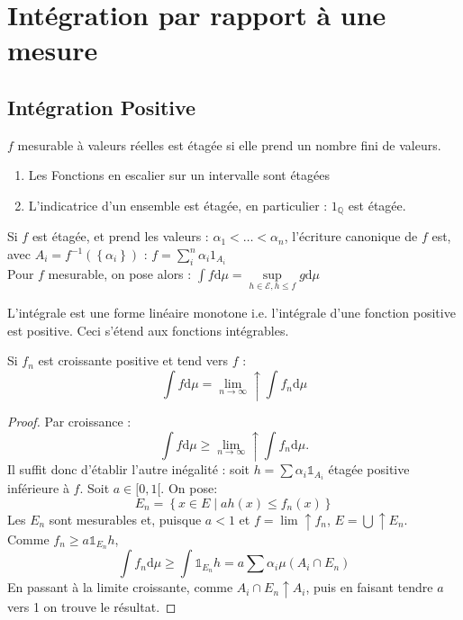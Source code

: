 \documentclass{cours}
\begin{document}
\section{Intégration par rapport à une mesure}
\subsection{Intégration Positive}
\begin{definition}
    $f$ mesurable à valeurs réelles est étagée si elle prend un nombre fini de valeurs.
\end{definition}
\begin{remark}
    \begin{enumerate}
        \item Les Fonctions en escalier sur un intervalle sont étagées
        \item L'indicatrice d'un ensemble est étagée, en particulier : $1_{\mathbb{Q}}$ est étagée.
    \end{enumerate}
\end{remark}
\begin{definition}
    Si $f$ est étagée, et prend les valeurs : $\alpha_{1} < \ldots < \alpha_{n}$, l'écriture canonique de $f$ est, avec $A_{i} = f^{-1}(\left\{\alpha_{i}\right\})$ :
    $f =  \sum\limits_{i}^{n} \alpha_{i}1_{A_{i}}$\\
    Pour $f$ mesurable, on pose alors : $\int f \mathrm{d}\mu = \sup\limits_{h \in \mathcal{E}, h \leq f} g \mathrm{d}\mu$
\end{definition}
\begin{proposition}
    L'intégrale est une forme linéaire monotone i.e. l'intégrale d'une fonction positive est positive. Ceci s'étend aux fonctions intégrables.
\end{proposition}
\begin{theorem}\label{TCM}
    Si $f_{n}$ est croissante positive et tend vers $f$ :
    \[
        \int f \mathrm{d}\mu = \lim_{n\to \infty} \uparrow \int f_{n} \mathrm{d} \mu
    \]
\end{theorem}
\begin{proof}
    Par croissance : \[ \int f \mathrm{d}\mu \geq \lim_{n \to \infty}\uparrow \int f_{n} \mathrm{d}\mu.\]
    Il suffit donc d'établir l'autre inégalité : soit $h = \sum \alpha_{i}\mathds{1}_{A_{i}}$ étagée positive inférieure à $f$. Soit $a \in [0, 1[$. On pose: \[E_{n} =\left\{x \in E \mid ah(x) \leq f_{n}(x)\right\}\]
    Les $E_{n}$ sont mesurables et, puisque $a < 1$ et $f = \lim \uparrow f_{n}$, $E = \bigcup \uparrow E_{n}$.\\
    Comme $f_{n} \geq a\mathds{1}_{E_{n}}h$, \[\int f_{n} \mathrm{d}\mu \geq \int \mathds{1}_{E_{n}}h = a \sum \alpha_{i}\mu(A_{i}\cap E_{n})\]
    En passant à la limite croissante, comme $A_{i} \cap E_{n} \uparrow A_{i}$, puis en faisant tendre $a$ vers 1 on trouve le résultat.
\end{proof}
\end{document}
